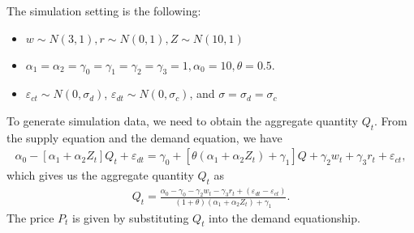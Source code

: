 \documentclass[11pt, a4paper]{article}
\numberwithin{figure}{section}
\theoremstyle{definition}
\newcommand{\0}{\mathbf{0}}
\begin{document}
The simulation setting is the following:
\begin{itemize}
    \item $w \sim N (3, 1), r \sim N (0, 1), Z \sim N (10, 1)$
    \item $\alpha_1 = \alpha_2 = \gamma_0 = \gamma_1 = \gamma_2  = \gamma_3 = 1, \alpha_0 = 10, \theta = 0.5.$
    \item $\varepsilon_{ct}\sim N(0,\sigma_d)$, $\varepsilon_{dt} \sim N(0,\sigma_c)$, and $\sigma = \sigma_d = \sigma_c$
\end{itemize}

To generate simulation data, we need to obtain the aggregate quantity $Q_t$.
From the supply equation and the demand equation, we have
\begin{align}
    \alpha_0 - [\alpha_1 + \alpha_2Z_t] Q_t + \varepsilon_{dt} = \gamma_0 + [\theta(\alpha_1 + \alpha_2Z_t)+ \gamma_1] Q   + \gamma_2 w_t + \gamma_3 r_t + \varepsilon_{ct},
\end{align}
which gives us the aggregate quantity $Q_t$ as 
\begin{align*}
    Q_t =  \frac{\alpha_0  - \gamma_0 - \gamma_2 w_t - \gamma_3 r_t + (\varepsilon_{dt} - \varepsilon_{ct})}{(1 + \theta) (\alpha_1 + \alpha_2Z_t) + \gamma_1}.
\end{align*}
The price $P_t$ is given by substituting $Q_t$ into the demand equationship.
\end{document}
